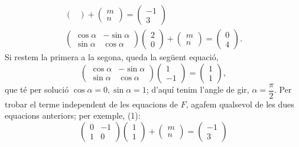 \documentclass[10pt]{article}
\begin{document}
\begin{itemize}
\begin{align}
\begin{pmatrix}
        \end{pmatrix}+\begin{pmatrix}m\\ n
        \end{pmatrix}=\begin{pmatrix}-1\\ 3
        \end{pmatrix}\\
        \begin{pmatrix}
        \cos{\alpha} & -\sin{\alpha}\\
        \sin{\alpha} & \cos{\alpha}
        \end{pmatrix}\begin{pmatrix}2\\ 0
        \end{pmatrix}+\begin{pmatrix}m\\ n
        \end{pmatrix}=\begin{pmatrix}0\\ 4
        \end{pmatrix}.
    \end{align}
    Si restem la primera a la segona, queda la següent equació,
    \[
        \begin{pmatrix}
        \cos{\alpha} & -\sin{\alpha}\\
        \sin{\alpha} & \cos{\alpha}
        \end{pmatrix}\begin{pmatrix}1\\ -1
        \end{pmatrix}=\begin{pmatrix}1\\ 1
        \end{pmatrix},
    \]
    que té per solució $\cos{\alpha}=0,\sin{\alpha}=1$; d'aquí tenim l'angle de gir, $\alpha=\dfrac{\pi}{2}$. Per trobar el terme independent de les equacions de $F$, agafem qualsevol de les dues equacions anteriors; per exemple, (1):
    \[    
        \begin{pmatrix}
        0 & -1\\
        1 & 0
        \end{pmatrix}\begin{pmatrix}1\\ 1
        \end{pmatrix}+\begin{pmatrix}m\\ n
        \end{pmatrix}=\begin{pmatrix}-1\\ 3

\end{pmatrix}\]
\end{itemize}
\end{document}
